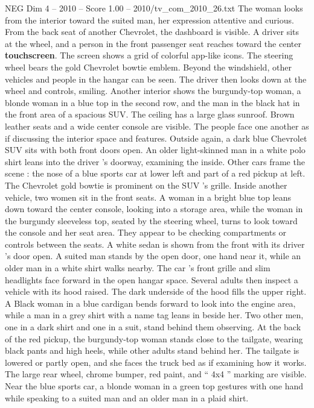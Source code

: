\begin{textsample}{NEG Dim 4 – 2010 – Score 1.00 – 2010/tv\_com\_2010\_26.txt}
The woman looks from the interior toward the suited man, her expression attentive and curious.
From the back seat of another Chevrolet, the dashboard is visible.
A driver sits at the wheel, and a person in the front passenger seat reaches toward the center \textbf{touchscreen}.
The screen shows a grid of colorful app-like icons.
The steering wheel bears the gold Chevrolet bowtie emblem.
Beyond the windshield, other vehicles and people in the hangar can be seen.
The driver then looks down at the wheel and controls, smiling.
Another interior shows the burgundy-top woman, a blonde woman in a blue top in the second row, and the man in the black hat in the front area of a spacious SUV.
The ceiling has a large glass sunroof.
Brown leather seats and a wide center console are visible.
The people face one another as if discussing the interior space and features.
Outside again, a dark blue Chevrolet SUV sits with both front doors open.
An older light-skinned man in a white polo shirt leans into the driver ’s doorway, examining the inside.
Other cars frame the scene : the nose of a blue sports car at lower left and part of a red pickup at left.
The Chevrolet gold bowtie is prominent on the SUV ’s grille.
Inside another vehicle, two women sit in the front seats.
A woman in a bright blue top leans down toward the center console, looking into a storage area, while the woman in the burgundy sleeveless top, seated by the steering wheel, turns to look toward the console and her seat area.
They appear to be checking compartments or controls between the seats.
A white sedan is shown from the front with its driver ’s door open.
A suited man stands by the open door, one hand near it, while an older man in a white shirt walks nearby.
The car ’s front grille and slim headlights face forward in the open hangar space.
Several adults then inspect a vehicle with its hood raised.
The dark underside of the hood fills the upper right.
A Black woman in a blue cardigan bends forward to look into the engine area, while a man in a grey shirt with a name tag leans in beside her.
Two other men, one in a dark shirt and one in a suit, stand behind them observing.
At the back of the red pickup, the burgundy-top woman stands close to the tailgate, wearing black pants and high heels, while other adults stand behind her.
The tailgate is lowered or partly open, and she faces the truck bed as if examining how it works.
The large rear wheel, chrome bumper, red paint, and “ 4x4 ” marking are visible.
Near the blue sports car, a blonde woman in a green top gestures with one hand while speaking to a suited man and an older man in a plaid shirt.

\end{textsample}
